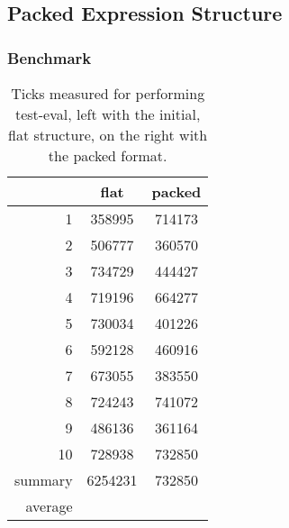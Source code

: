 \documentclass[12pt]{article}
\begin{document}
\subsection{Packed Expression Structure}

\subsubsection{Benchmark}


\begin{table}
    \centering
    \begin{tabular}{r|c|c}
           & flat  & packed \\
        \hline 
         1 & 358995 & 714173 \\
         2 & 506777 & 360570 \\
         3 & 734729 & 444427 \\
         4 & 719196 & 664277 \\
         5 & 730034 & 401226 \\
         6 & 592128 & 460916 \\
         7 & 673055 & 383550 \\
         8 & 724243 & 741072 \\
         9 & 486136 & 361164 \\
        10 & 728938 & 732850 \\
        \hline
        summary & 6254231 & 732850 \\
        \hline
        average & & 
    \end{tabular}
    \caption{\label{tbl:BMResultsExpressionFormat} Ticks measured for performing
        test-eval, left with the initial, flat structure, on
    the right with the packed format.}
\end{table}
\end{document}
